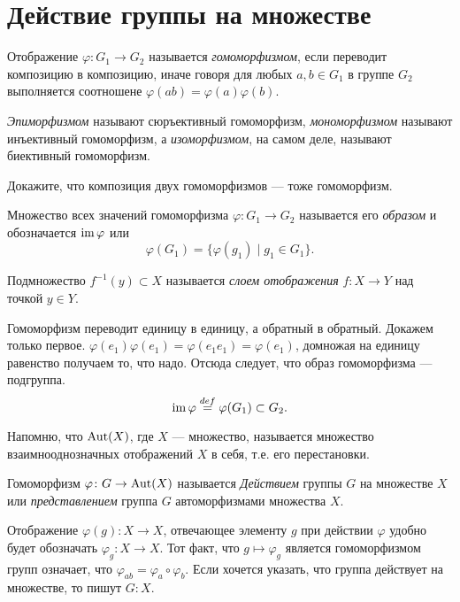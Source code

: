 \section{Действие группы на множестве}
\begin{definition}
    Отображение $\varphi\colon G_1 \to G_2$ называется \emph{гомоморфизмом}, если переводит композицию в композицию, иначе говоря для любых $a,b \in G_1$ в группе $G_2$ выполняется соотношене \(\varphi(ab) = \varphi(a)\varphi(b)\).

    \emph{Эпиморфизмом} называют сюръективный гомоморфизм, \emph{мономорфизмом} называют инъективный гомоморфизм, а \emph{изоморфизмом}, на самом деле, называют биективный гомоморфизм.
\end{definition}

\begin{practice}
    Докажите, что композиция двух гомоморфизмов --- тоже гомоморфизм.
\end{practice}


\begin{definition}
    Множество всех значений гомоморфизма $\varphi \colon G_1 \to G_2$ называется его \emph{образом} и обозначается $\operatorname{im} \varphi$ или $$\varphi (G_1) = \{\varphi(g_1)\mid g_1 \in G_1\}.$$
\end{definition}

\begin{definition}
    Подмножество $f^{-1}(y) \subset X$ называется \emph{слоем отображения} $f \colon X \to Y$ над точкой $y \in Y$.
\end{definition}

Гомоморфизм переводит единицу в единицу, а обратный в обратный. Докажем только первое. \(\varphi(e_1)\varphi(e_1) = \varphi(e_1e_1)=\varphi(e_1)\), домножая на единицу равенство получаем то, что надо. Отсюда следует, что образ гомоморфизма --- подгруппа. \[\operatorname{im} \varphi \overset{def}{=} \varphi(G_1) \subset G_2.\]

Напомню, что $\operatorname{Aut}(X)$, где $X$ --- множество, называется множество взаимнооднозначных отображений $X$ в себя, т.е. его перестановки.

\begin{definition}
Гомоморфизм $\varphi\colon G \to \operatorname{Aut}(X)$ называется \emph{Действием} группы $G$ на множестве $X$ или \emph{представлением} группа $G$ автоморфизмами множества $X$. 

Отображение $\varphi(g) \colon X \to X$, отвечающее элементу $g$ при действии $\varphi$ удобно будет обозначать $\varphi_g \colon X \to X$. Тот факт, что $g \mapsto \varphi_g$ является гомоморфизмом групп означает, что $\varphi_{ab} = \varphi_a \circ \varphi_b$. Если хочется указать, что группа действует на множестве, то пишут $G \colon X$.
\end{definition}

